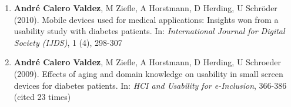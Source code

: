 \documentclass[11pt,a4paper,sans]{moderncv}
\begin{document}
\begin{enumerate}
{  Valdez} (2010). Motivational features of a mobile web application
  promoting a healthy lifestyle.. , 24th BCS Conference on Human
  Computer Interaction (cited 1 times)
\item
  \textbf{André Calero Valdez}, M Ziefle, A Horstmann, D Herding, U
  Schröder (2010). Mobile devices used for medical applications:
  Insights won from a usability study with diabetes patients. In:
  \emph{International Journal for Digital Society (IJDS)}, 1 (4),
  298-307
\item
  \textbf{André Calero Valdez}, M Ziefle, A Horstmann, D Herding, U
  Schroeder (2009). Effects of aging and domain knowledge on usability
  in small screen devices for diabetes patients. In: \emph{HCI and
  Usability for e-Inclusion}, 366-386 (cited 23 times)
\end{enumerate}
\end{document}
